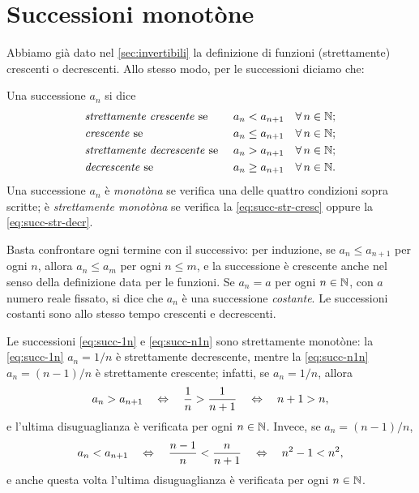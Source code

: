 \section{Successioni monotòne}
\label{sec:monotone}

Abbiamo già dato nel \cref{sec:invertibili} la definizione di funzioni (strettamente)
crescenti o decrescenti. Allo stesso modo, per le successioni diciamo che:

\begin{definizione}
Una successione $a_{n}$ si dice
\begin{align}
  &\text{\emph{strettamente crescente}} \text{ se } & a_{n}&<a_{n+1} & &\forall\, n\in\mathbb{N}; \label{eq:succ-str-cresc}\\
  &\text{\emph{crescente}} \text{ se } & a_{n}&\le a_{n+1} & &\forall\, n\in\mathbb{N}; \label{eq:succ-cresc}\\
  &\text{\emph{strettamente decrescente}} \text{ se } & a_{n}&>a_{n+1} & &\forall\, n\in\mathbb{N}; \label{eq:succ-str-decr}\\
  &\text{\emph{decrescente}} \text{ se } & a_{n}&\ge a_{n+1} & &\forall\, n\in\mathbb{N}. \label{eq:succ-decr}
\end{align}
Una successione $a_{n}$ è \emph{monotòna} se verifica una delle quattro condizioni sopra
scritte; è \emph{strettamente monotòna} se verifica la \eqref{eq:succ-str-cresc} oppure la
\eqref{eq:succ-str-decr}.
\end{definizione}

Basta confrontare ogni termine con il successivo: per induzione, se $a_{n}\le a_{n+1}$
per ogni $n$, allora $a_{n}\le a_{m}$ per ogni $n\le m$, e la successione è crescente
anche nel senso della definizione data per le funzioni. Se $a_{n}=a$ per ogni $n\in\mathbb{N}$,
con $a$ numero reale fissato, si dice che $a_{n}$ è una successione \emph{costante}. Le
successioni costanti sono allo stesso tempo crescenti e decrescenti.

\begin{esempio}
Le successioni \eqref{eq:succ-1n} e \eqref{eq:succ-n1n} sono strettamente monotòne: la
\eqref{eq:succ-1n} $a_{n}=1/n$ è strettamente decrescente, mentre la \eqref{eq:succ-n1n}
$a_{n}=(n-1)/n$ è strettamente crescente; infatti, se $a_{n}=1/n$, allora
\begin{equation}\label{eq:es-monotona-1}
  a_{n}>a_{n+1} \quad\Leftrightarrow\quad \frac1n>\frac1{n+1} \quad\Leftrightarrow\quad n+1>n,
\end{equation}
e l'ultima disuguaglianza è verificata per ogni $n\in\mathbb{N}$. Invece, se $a_{n}=(n-1)/n$,
\begin{equation}\label{eq:es-monotona-2}
  a_{n}<a_{n+1} \quad\Leftrightarrow\quad \frac{n-1}{n}<\frac{n}{n+1} \quad\Leftrightarrow\quad n^{2}-1<n^{2},
\end{equation}
e anche questa volta l'ultima disuguaglianza è verificata per ogni $n\in\mathbb{N}$.
\end{esempio}

